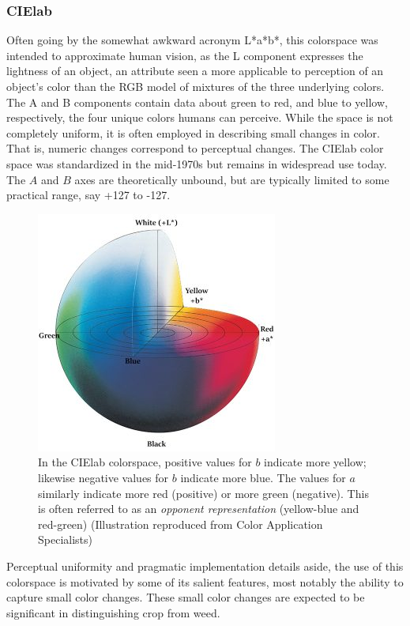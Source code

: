 \documentclass[letterpaper]{article}
\begin{document}
{\subsubsection{CIElab}
Often going by the somewhat awkward acronym L*a*b*, this colorspace was intended to approximate human vision, as the L component expresses  the lightness of an object, an attribute seen a more applicable to perception of an object's color than the RGB model of mixtures of the three underlying colors.  The A and B components contain data about green to red, and blue to yellow, respectively, the four unique colors humans can perceive. While the space is not completely uniform, it is often employed in describing small changes in color. That is, numeric changes correspond to perceptual changes. The CIElab color space was standardized in the mid-1970s but remains in widespread use today. \parencite{Wikipedia_contributors2023-xt}  The $A$ and $B$ axes are theoretically unbound, but are typically limited to some practical range, say +127 to -127. 

\begin{figure}[H]
	\centering
	\includegraphics[width=.35\linewidth]{./figures/cielab-colorspace.jpg}
	\caption[CIElab colorspace]{In the CIElab colorspace, positive values for $b$ indicate more yellow; likewise negative values for $b$ indicate more blue. The values for $a$ similarly indicate more red (positive) or more green (negative). This is often referred to as an \textit{opponent representation} (yellow-blue and red-green) (Illustration reproduced from Color Application Specialists)}
	\label{fig:cielab}	
\end{figure}

Perceptual uniformity and pragmatic implementation details aside, the use of this colorspace is motivated by some of its salient features, most notably the ability to capture small color changes. These small color changes are expected to be significant in distinguishing crop from weed.

}
\end{document}
